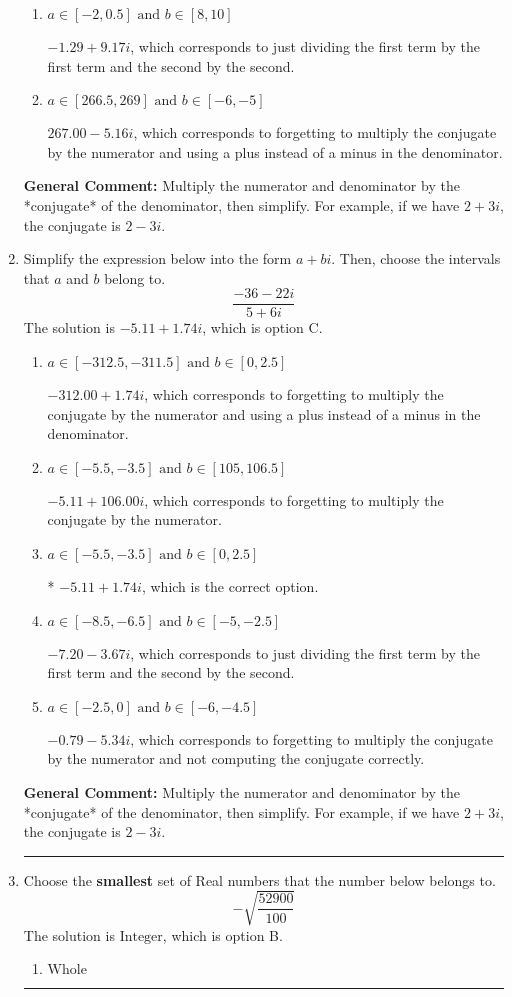 \documentclass{extbook}[14pt]
\newcommand{\litem}[1]{\item #1

\rule{\textwidth}{0.4pt}}
\begin{document}
\begin{enumerate}
{\begin{enumerate}[label=\Alph*.]
 $-4.62  - 3.89 i$, which corresponds to forgetting to multiply the conjugate by the numerator and not computing the conjugate correctly.
\item \( a \in [-2, 0.5] \text{ and } b \in [8, 10] \)

 $-1.29  + 9.17 i$, which corresponds to just dividing the first term by the first term and the second by the second.
\item \( a \in [266.5, 269] \text{ and } b \in [-6, -5] \)

 $267.00  - 5.16 i$, which corresponds to forgetting to multiply the conjugate by the numerator and using a plus instead of a minus in the denominator.
\end{enumerate}

\textbf{General Comment:} Multiply the numerator and denominator by the *conjugate* of the denominator, then simplify. For example, if we have $2+3i$, the conjugate is $2-3i$.
}
\litem{
Simplify the expression below into the form $a+bi$. Then, choose the intervals that $a$ and $b$ belong to.
\[ \frac{-36 - 22 i}{5 + 6 i} \]The solution is \( -5.11  + 1.74 i \), which is option C.\begin{enumerate}[label=\Alph*.]
\item \( a \in [-312.5, -311.5] \text{ and } b \in [0, 2.5] \)

 $-312.00  + 1.74 i$, which corresponds to forgetting to multiply the conjugate by the numerator and using a plus instead of a minus in the denominator.
\item \( a \in [-5.5, -3.5] \text{ and } b \in [105, 106.5] \)

 $-5.11  + 106.00 i$, which corresponds to forgetting to multiply the conjugate by the numerator.
\item \( a \in [-5.5, -3.5] \text{ and } b \in [0, 2.5] \)

* $-5.11  + 1.74 i$, which is the correct option.
\item \( a \in [-8.5, -6.5] \text{ and } b \in [-5, -2.5] \)

 $-7.20  - 3.67 i$, which corresponds to just dividing the first term by the first term and the second by the second.
\item \( a \in [-2.5, 0] \text{ and } b \in [-6, -4.5] \)

 $-0.79  - 5.34 i$, which corresponds to forgetting to multiply the conjugate by the numerator and not computing the conjugate correctly.
\end{enumerate}

\textbf{General Comment:} Multiply the numerator and denominator by the *conjugate* of the denominator, then simplify. For example, if we have $2+3i$, the conjugate is $2-3i$.
}
\litem{
Choose the \textbf{smallest} set of Real numbers that the number below belongs to.
\[ -\sqrt{\frac{52900}{100}} \]The solution is \( \text{Integer} \), which is option B.\begin{enumerate}[label=\Alph*.]
\item \( \text{Whole} \)


\end{enumerate}}
\end{enumerate}
\end{document}
